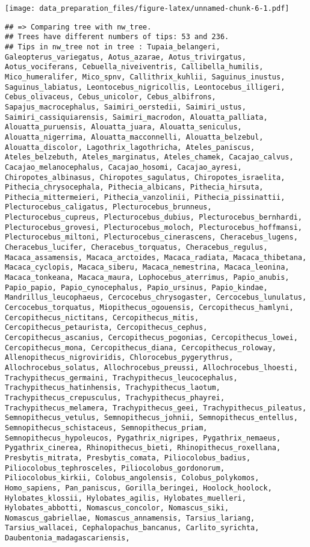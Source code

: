 \documentclass[
]{article}
\begin{document}
\texttt{[image: data\_preparation\_files/figure-latex/unnamed-chunk-6-1.pdf]}

\begin{verbatim}
## => Comparing tree with nw_tree.
## Trees have different numbers of tips: 53 and 236.
## Tips in nw_tree not in tree : Tupaia_belangeri, Galeopterus_variegatus, Aotus_azarae, Aotus_trivirgatus, Aotus_vociferans, Cebuella_niveiventris, Callibella_humilis, Mico_humeralifer, Mico_spnv, Callithrix_kuhlii, Saguinus_inustus, Saguinus_labiatus, Leontocebus_nigricollis, Leontocebus_illigeri, Cebus_olivaceus, Cebus_unicolor, Cebus_albifrons, Sapajus_macrocephalus, Saimiri_oerstedii, Saimiri_ustus, Saimiri_cassiquiarensis, Saimiri_macrodon, Alouatta_palliata, Alouatta_puruensis, Alouatta_juara, Alouatta_seniculus, Alouatta_nigerrima, Alouatta_macconnelli, Alouatta_belzebul, Alouatta_discolor, Lagothrix_lagothricha, Ateles_paniscus, Ateles_belzebuth, Ateles_marginatus, Ateles_chamek, Cacajao_calvus, Cacajao_melanocephalus, Cacajao_hosomi, Cacajao_ayresi, Chiropotes_albinasus, Chiropotes_sagulatus, Chiropotes_israelita, Pithecia_chrysocephala, Pithecia_albicans, Pithecia_hirsuta, Pithecia_mittermeieri, Pithecia_vanzolinii, Pithecia_pissinattii, Plecturocebus_caligatus, Plecturocebus_brunneus, Plecturocebus_cupreus, Plecturocebus_dubius, Plecturocebus_bernhardi, Plecturocebus_grovesi, Plecturocebus_moloch, Plecturocebus_hoffmansi, Plecturocebus_miltoni, Plecturocebus_cinerascens, Cheracebus_lugens, Cheracebus_lucifer, Cheracebus_torquatus, Cheracebus_regulus, Macaca_assamensis, Macaca_arctoides, Macaca_radiata, Macaca_thibetana, Macaca_cyclopis, Macaca_siberu, Macaca_nemestrina, Macaca_leonina, Macaca_tonkeana, Macaca_maura, Lophocebus_aterrimus, Papio_anubis, Papio_papio, Papio_cynocephalus, Papio_ursinus, Papio_kindae, Mandrillus_leucophaeus, Cercocebus_chrysogaster, Cercocebus_lunulatus, Cercocebus_torquatus, Miopithecus_ogouensis, Cercopithecus_hamlyni, Cercopithecus_nictitans, Cercopithecus_mitis, Cercopithecus_petaurista, Cercopithecus_cephus, Cercopithecus_ascanius, Cercopithecus_pogonias, Cercopithecus_lowei, Cercopithecus_mona, Cercopithecus_diana, Cercopithecus_roloway, Allenopithecus_nigroviridis, Chlorocebus_pygerythrus, Allochrocebus_solatus, Allochrocebus_preussi, Allochrocebus_lhoesti, Trachypithecus_germaini, Trachypithecus_leucocephalus, Trachypithecus_hatinhensis, Trachypithecus_laotum, Trachypithecus_crepusculus, Trachypithecus_phayrei, Trachypithecus_melamera, Trachypithecus_geei, Trachypithecus_pileatus, Semnopithecus_vetulus, Semnopithecus_johnii, Semnopithecus_entellus, Semnopithecus_schistaceus, Semnopithecus_priam, Semnopithecus_hypoleucos, Pygathrix_nigripes, Pygathrix_nemaeus, Pygathrix_cinerea, Rhinopithecus_bieti, Rhinopithecus_roxellana, Presbytis_mitrata, Presbytis_comata, Piliocolobus_badius, Piliocolobus_tephrosceles, Piliocolobus_gordonorum, Piliocolobus_kirkii, Colobus_angolensis, Colobus_polykomos, Homo_sapiens, Pan_paniscus, Gorilla_beringei, Hoolock_hoolock, Hylobates_klossii, Hylobates_agilis, Hylobates_muelleri, Hylobates_abbotti, Nomascus_concolor, Nomascus_siki, Nomascus_gabriellae, Nomascus_annamensis, Tarsius_lariang, Tarsius_wallacei, Cephalopachus_bancanus, Carlito_syrichta, Daubentonia_madagascariensis, 
\end{verbatim}
\end{document}
